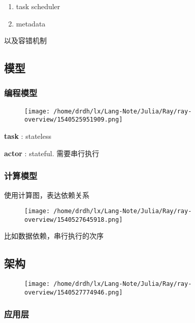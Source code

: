 \documentclass[]{article}
\begin{document}
\begin{enumerate}
\def\labelenumi{\arabic{enumi}.}
\item
  task scheduler
\item
  metadata
\end{enumerate}

以及容错机制

\subsection{模型}\label{header-n137}

\subsubsection{编程模型}\label{header-n138}

\begin{figure}
\centering
\texttt{[image: /home/drdh/lx/Lang-Note/Julia/Ray/ray-overview/1540525951909.png]}
\caption{}
\end{figure}

\textbf{task} : stateless

\textbf{actor} : stateful. 需要串行执行

\subsubsection{计算模型}\label{header-n142}

使用计算图，表达依赖关系

\begin{figure}
\centering
\texttt{[image: /home/drdh/lx/Lang-Note/Julia/Ray/ray-overview/1540527645918.png]}
\caption{}
\end{figure}

比如数据依赖，串行执行的次序

\subsection{架构}\label{header-n146}

\begin{figure}
\centering
\texttt{[image: /home/drdh/lx/Lang-Note/Julia/Ray/ray-overview/1540527774946.png]}
\caption{}
\end{figure}

\subsubsection{应用层}\label{header-n148}
\end{document}
